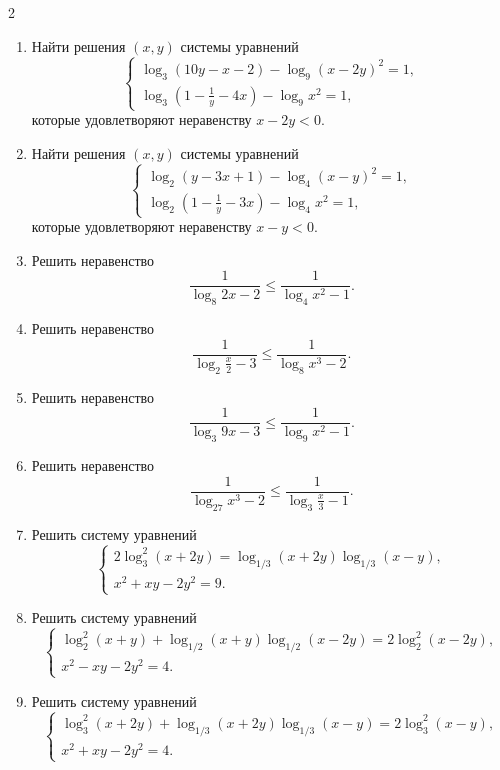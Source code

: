 \documentclass[14pt,a4paper,landscape]{article}
\begin{document}
\begin{multicols}{2}
\begin{enumerate}[label=3.\arabic*, leftmargin=1.5em]
$$\begin{cases}
    \log_2(3y-3x+1) - \log_4(x-3y)^2 = 1, \\
    \log_2\left(1-\frac{1}{y}-3x\right) - \log_4 x^2 = 1,
    \end{cases}
    $$
    которые удовлетворяют неравенству $x-3y < 0$.
    \item Найти решения $(x,y)$ системы уравнений
    $$
    \begin{cases}
    \log_3(10y-x-2) - \log_9(x-2y)^2 = 1, \\
    \log_3\left(1-\frac{1}{y}-4x\right) - \log_9 x^2 = 1,
    \end{cases}
    $$
    которые удовлетворяют неравенству $x-2y < 0$.
    \item Найти решения $(x,y)$ системы уравнений
    $$
    \begin{cases}
    \log_2(y-3x+1) - \log_4(x-y)^2 = 1, \\
    \log_2\left(1-\frac{1}{y}-3x\right) - \log_4 x^2 = 1,
    \end{cases}
    $$
    которые удовлетворяют неравенству $x-y < 0$.
    \item Решить неравенство $$\frac{1}{\log_8 2x - 2} \leqslant \frac{1}{\log_4 x^2 - 1}.$$
    \item Решить неравенство $$\frac{1}{\log_2 \frac{x}{2} - 3} \leqslant \frac{1}{\log_8 x^3 - 2}.$$
    \item Решить неравенство $$\frac{1}{\log_3 9x - 3} \leqslant \frac{1}{\log_9 x^2 - 1}.$$
    \item Решить неравенство $$\frac{1}{\log_{27} x^3 - 2} \leqslant \frac{1}{\log_3 \frac{x}{3} - 1}.$$
    \item Решить систему уравнений
    $$
    \begin{cases}
    2\log_3^2(x+2y) = \log_{1/3}(x+2y)\log_{1/3}(x-y), \\
    x^2+xy-2y^2=9.
    \end{cases}
    $$
    \item Решить систему уравнений
    $$
    \begin{cases}
    \log_2^2(x+y) + \log_{1/2}(x+y)\log_{1/2}(x-2y) = 2\log_2^2(x-2y), \\
    x^2-xy-2y^2=4.
    \end{cases}
    $$
    \item Решить систему уравнений
    $$
    \begin{cases}
    \log_3^2(x+2y) + \log_{1/3}(x+2y)\log_{1/3}(x-y) = 2\log_3^2(x-y), \\
    x^2+xy-2y^2=4.
    \end{cases}
$$
\end{enumerate}
\end{multicols}
\end{document}
